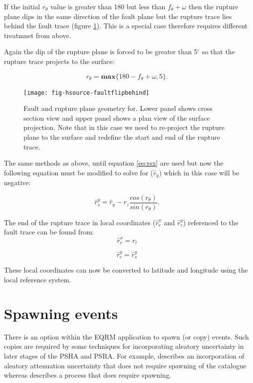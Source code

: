 If the initial $r_\theta$ value is greater than 180 but less than $f_\theta + \omega$ then the rupture 
plane dips in the same direction of the fault plane but the rupture trace lies behind the fault trace (figure \ref{fig:gt180}). This is a special case therefore requires different
treatmnet from above.

Again the dip of the rupture plane is forced to be greater than 5$^\circ$ so 
that the rupture trace projects to the surface:

\begin{equation}
r_\theta = \mathbf{max} \{ 180 - f_\theta + \omega, 5 \} .
\end{equation}

\begin{figure}[htp]
\centerline{\texttt{[image: fig-hsource-faultflipbehind]}}
\caption{Fault and rupture plane geometry for. Lower panel shows cross section view and upper panel shows 
a plan view of the surface projection. Note that in this case we need to re-project the rupture plane to 
the surface and redefine the start and end of the rupture trace.}
\label{fig:gt180}
\end{figure}

The same methods as above, until equation \ref{eq:rsx} are used but now the following equation must be modified
to solve for ($\hat{r}_y$) which in this case will be negative:

\begin{equation}\label{eq:ry4}
\hat{r}_s^y = \hat{r}_y -  r_z  \frac{cos(r_\theta)}{sin(r_\theta)}.
\end{equation}

The end of the rupture trace in local coordinates ($\hat{r}_e^x$ and $\hat{r}_e^y$) referenced to the fault 
trace can be found from:
\begin{equation}
\hat{r}_e^x = r_l
\end{equation}

\begin{equation}
\hat{r}_e^y = \hat{r}_s^y
\end{equation}

These local coordinates can now be converted to latitude and longitude using the local reference system. 


\section{Spawning events}
\label{source:spawning}


There is an option within the EQRM application to spawn (or copy)
events. Such copies are required by some techniques for
incorporating aleatory uncertainty in later stages of the PSHA and
PSRA. For example,  describes an
incorporation of aleatory attenuation uncertainty that does not
require spawning of the catalogue whereas
 describes a process that does require
spawning. 

